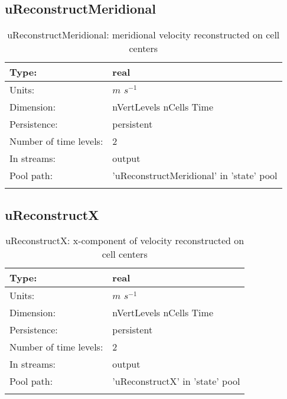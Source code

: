 \subsection[uReconstructMeridional]{uReconstructMeridional}
\label{subsec:var_sec_state_uReconstructMeridional}
\begin{center}
\begin{longtable}{| p{2.0in} | p{4.0in} |}
        \hline 
        Type: & real \\
        \hline 
        Units: & $m$ $s^{-1}$ \\
        \hline 
        Dimension: & nVertLevels nCells Time \\
        \hline 
        Persistence: & persistent \\
        \hline 
        Number of time levels: & 2 \\
        \hline 
		 In streams: &  output \\
        \hline 
            Pool path: & 'uReconstructMeridional' in 'state' pool
 \\
		 \hline 
    \caption{uReconstructMeridional: meridional velocity reconstructed on cell centers}
\end{longtable}
\end{center}
\subsection[uReconstructX]{uReconstructX}
\label{subsec:var_sec_state_uReconstructX}
\begin{center}
\begin{longtable}{| p{2.0in} | p{4.0in} |}
        \hline 
        Type: & real \\
        \hline 
        Units: & $m$ $s^{-1}$ \\
        \hline 
        Dimension: & nVertLevels nCells Time \\
        \hline 
        Persistence: & persistent \\
        \hline 
        Number of time levels: & 2 \\
        \hline 
		 In streams: &  output \\
        \hline 
            Pool path: & 'uReconstructX' in 'state' pool
 \\
		 \hline 
    \caption{uReconstructX: x-component of velocity reconstructed on cell centers}
\end{longtable}
\end{center}
